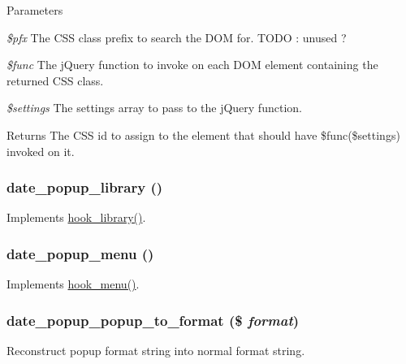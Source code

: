 \begin{DoxyParams}{Parameters}
\item[{\em \$pfx}]The CSS class prefix to search the DOM for. TODO : unused ? \item[{\em \$func}]The jQuery function to invoke on each DOM element containing the returned CSS class. \item[{\em \$settings}]The settings array to pass to the jQuery function. \end{DoxyParams}
\begin{DoxyReturn}{Returns}
The CSS id to assign to the element that should have \$func(\$settings) invoked on it. 
\end{DoxyReturn}
\hypertarget{date__popup_8module_af4c7a08e45fc8c75254a468d27d9bbfa}{
\subsubsection[{date\_\-popup\_\-library}]{\setlength{\rightskip}{0pt plus 5cm}date\_\-popup\_\-library ()}}
\label{date__popup_8module_af4c7a08e45fc8c75254a468d27d9bbfa}
Implements \hyperlink{group__hooks_ga6bf3f83fa2e373836f5aa78fd143d1cd}{hook\_\-library()}. \hypertarget{date__popup_8module_a720b482218ecb300ee851f77d166633d}{
\subsubsection[{date\_\-popup\_\-menu}]{\setlength{\rightskip}{0pt plus 5cm}date\_\-popup\_\-menu ()}}
\label{date__popup_8module_a720b482218ecb300ee851f77d166633d}
Implements \hyperlink{group__hooks_ga5c95244fea59b25666e409759e133ded}{hook\_\-menu()}. \hypertarget{date__popup_8module_ab3bb16ecb487ede2fef0fe0e70bf92bb}{
\subsubsection[{date\_\-popup\_\-popup\_\-to\_\-format}]{\setlength{\rightskip}{0pt plus 5cm}date\_\-popup\_\-popup\_\-to\_\-format (\$ {\em format})}}
\label{date__popup_8module_ab3bb16ecb487ede2fef0fe0e70bf92bb}
Reconstruct popup format string into normal format string.


